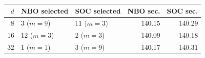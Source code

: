 \begin{tabular}{rllrr}
\toprule
$d$ & NBO selected & SOC selected & NBO sec. & SOC sec. \\
\midrule
8 & 3 ($m=9$) & 11 ($m=3$) & 140.15 & 140.29 \\
16 & 12 ($m=3$) & 2 ($m=3$) & 140.09 & 140.18 \\
32 & 1 ($m=1$) & 3 ($m=9$) & 140.17 & 140.31 \\
\bottomrule
\end{tabular}
